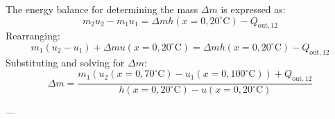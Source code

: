 The energy balance for determining the mass \( \Delta m \) is expressed as:  
\[
m_2 u_2 - m_1 u_1 = \Delta m h(x=0, 20^\circ\text{C}) - Q_{\text{out},12}
\]  
Rearranging:  
\[
m_1 \left(u_2 - u_1\right) + \Delta m u(x=0, 20^\circ\text{C}) = \Delta m h(x=0, 20^\circ\text{C}) - Q_{\text{out},12}
\]  
Substituting and solving for \( \Delta m \):  
\[
\Delta m = \frac{m_1 \left(u_2(x=0, 70^\circ\text{C}) - u_1(x=0, 100^\circ\text{C})\right) + Q_{\text{out},12}}{h(x=0, 20^\circ\text{C}) - u(x=0, 20^\circ\text{C})}
\]  

---